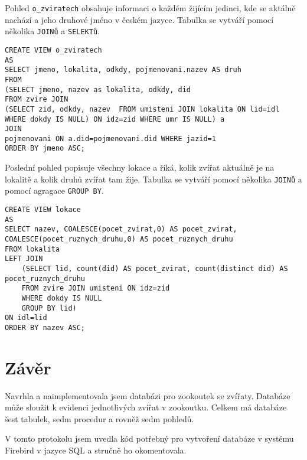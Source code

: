 \documentclass{article}
\begin{document}
Pohled \texttt{o\_zviratech} obsahuje informaci o každém žijícím jedinci, kde se aktálně nachází a jeho druhové jméno v českém jazyce.  Tabulka se vytváří pomocí několika \texttt{JOINů} a \texttt{SELEKTů}.

\begin{lstlisting}
CREATE VIEW o_zviratech
AS
SELECT jmeno, lokalita, odkdy, pojmenovani.nazev AS druh
FROM
(SELECT jmeno, nazev as lokalita, odkdy, did
FROM zvire JOIN 
(SELECT zid, odkdy, nazev  FROM umisteni JOIN lokalita ON lid=idl WHERE dokdy IS NULL) ON idz=zid WHERE umr IS NULL) a
JOIN 
pojmenovani ON a.did=pojmenovani.did WHERE jazid=1
ORDER BY jmeno ASC;
\end{lstlisting}

Poslední pohled popisuje všechny lokace a říká, kolik zvířat aktuálně je na lokalitě a kolik druhů zvířat tam žije. Tabulka se vytváří pomocí několika \texttt{JOINů} a pomocí agragace \texttt{GROUP BY}.

\begin{lstlisting}
CREATE VIEW lokace
AS 
SELECT nazev, COALESCE(pocet_zvirat,0) AS pocet_zvirat, COALESCE(pocet_ruznych_druhu,0) AS pocet_ruznych_druhu
FROM lokalita
LEFT JOIN 
    (SELECT lid, count(did) AS pocet_zvirat, count(distinct did) AS pocet_ruznych_druhu
    FROM zvire JOIN umisteni ON idz=zid 
    WHERE dokdy IS NULL 
    GROUP BY lid) 
ON idl=lid
ORDER BY nazev ASC;
\end{lstlisting}


\section{Závěr}

Navrhla a naimplementovala jsem databázi pro zookoutek se zvířaty. Databáze může sloužit k evidenci jednotlivých zvířat v zookoutku. Celkem má databáze šest tabulek, sedm procedur a rovněž sedm pohledů.

V tomto protokolu jsem uvedla kód potřebný pro vytvoření databáze v systému Firebird v jazyce SQL a stručně ho okomentovala.
\end{document}
